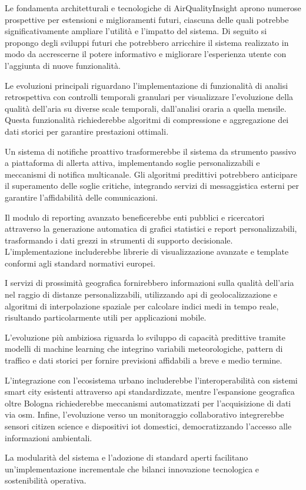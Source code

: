 Le fondamenta architetturali e tecnologiche di AirQualityInsight aprono numerose prospettive per
estensioni e miglioramenti futuri, ciascuna delle quali potrebbe significativamente ampliare
l'utilità e l'impatto del sistema.
Di seguito si propongo degli sviluppi futuri che potrebbero arricchire il sistema realizzato in modo da accrescerne
il potere informativo e migliorare l'esperienza utente con l'aggiunta di nuove funzionalità.

Le evoluzioni principali riguardano l'implementazione di funzionalità di analisi retrospettiva con controlli temporali
granulari per visualizzare l'evoluzione della qualità dell'aria su diverse scale temporali, dall'analisi oraria a
quella mensile. Questa funzionalità richiederebbe algoritmi di compressione e aggregazione dei dati storici
per garantire prestazioni ottimali.

Un sistema di notifiche proattivo trasformerebbe il sistema da strumento passivo a piattaforma di allerta attiva,
implementando soglie personalizzabili e meccanismi di notifica multicanale. Gli algoritmi predittivi potrebbero
anticipare il superamento delle soglie critiche, integrando servizi di messaggistica esterni
per garantire l'affidabilità delle comunicazioni.

Il modulo di reporting avanzato beneficerebbe enti pubblici e ricercatori attraverso la generazione automatica
di grafici statistici e report personalizzabili, trasformando i dati grezzi in strumenti di supporto decisionale.
L'implementazione includerebbe librerie di visualizzazione avanzate e template conformi agli standard normativi europei.

I servizi di prossimità geografica fornirebbero informazioni sulla qualità dell'aria nel raggio
di distanze personalizzabili, utilizzando \acrshort{api} di geolocalizzazione e algoritmi di interpolazione spaziale
per calcolare indici medi in tempo reale, risultando particolarmente utili per applicazioni mobile.

L'evoluzione più ambiziosa riguarda lo sviluppo di capacità predittive tramite modelli di machine learning
che integrino variabili meteorologiche, pattern di traffico e dati storici per fornire
previsioni affidabili a breve e medio termine.

L'integrazione con l'ecosistema urbano includerebbe l'interoperabilità con sistemi smart city
esistenti attraverso \acrshort{api} standardizzate, mentre l'espansione geografica oltre Bologna richiederebbe
meccanismi automatizzati per l'acquisizione di dati via \acrlong{osm}. Infine, l'evoluzione verso un monitoraggio
collaborativo integrerebbe sensori citizen science e dispositivi \acrshort{iot} domestici, democratizzando l'accesso
alle informazioni ambientali.

La modularità del sistema e l'adozione di standard aperti facilitano un'implementazione
incrementale che bilanci innovazione tecnologica e sostenibilità operativa.